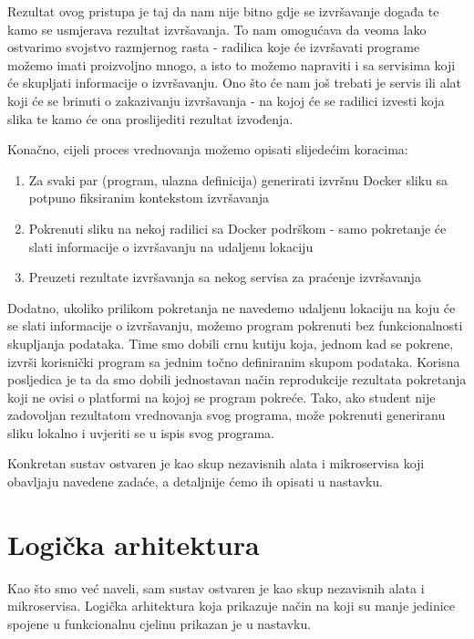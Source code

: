 \documentclass[times, utf8, zavrsni]{fer}
\begin{document}
Rezultat ovog pristupa je taj da nam nije bitno gdje se izvršavanje događa te kamo se usmjerava rezultat izvršavanja. To nam omogućava da veoma lako ostvarimo svojstvo razmjernog rasta - radilica koje će izvršavati programe možemo imati proizvoljno mnogo, a isto to možemo napraviti i sa servisima koji će skupljati informacije o izvršavanju. Ono što će nam još trebati je servis ili alat koji će se brinuti o zakazivanju izvršavanja - na kojoj će se radilici izvesti koja slika te kamo će ona proslijediti rezultat izvođenja.

Konačno, cijeli proces vrednovanja možemo opisati slijedećim koracima:

\begin{enumerate}
\item Za svaki par (program, ulazna definicija) generirati izvršnu Docker sliku sa potpuno fiksiranim kontekstom izvršavanja
\item Pokrenuti sliku na nekoj radilici sa Docker podrškom - samo pokretanje će slati informacije o izvršavanju na udaljenu lokaciju
\item Preuzeti rezultate izvršavanja sa nekog servisa za praćenje izvršavanja
\end{enumerate}

Dodatno, ukoliko prilikom pokretanja ne navedemo udaljenu lokaciju na koju će se slati informacije o izvršavanju, možemo program pokrenuti bez funkcionalnosti skupljanja podataka. Time smo dobili crnu kutiju koja, jednom kad se pokrene, izvrši korisnički program sa jednim točno definiranim skupom podataka. Korisna posljedica je ta da smo dobili jednostavan način reprodukcije rezultata pokretanja koji ne ovisi o platformi na kojoj se program pokreće. Tako, ako student nije zadovoljan rezultatom vrednovanja svog programa, može pokrenuti generiranu sliku lokalno i uvjeriti se u ispis svog programa.

Konkretan sustav ostvaren je kao skup nezavisnih alata i mikroservisa koji obavljaju navedene zadaće, a detaljnije ćemo ih opisati u nastavku.

\section{Logička arhitektura}

Kao što smo već naveli, sam sustav ostvaren je kao skup nezavisnih alata i mikroservisa. Logička arhitektura koja prikazuje način na koji su manje jedinice spojene u funkcionalnu cjelinu prikazan je u nastavku.
\end{document}
